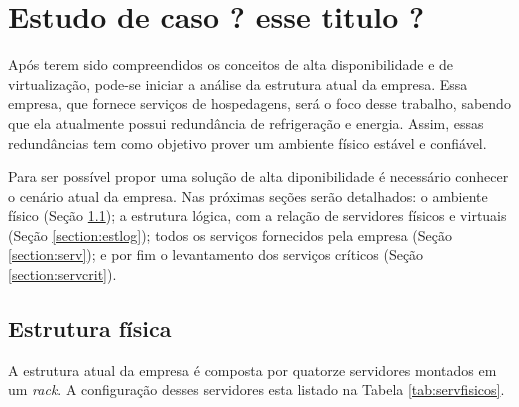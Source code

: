 \chapter{Estudo de caso ? esse titulo ?}
\label{cap:estudodecaso}

Após terem sido compreendidos os conceitos de alta disponibilidade e de virtualização, pode-se iniciar a análise da estrutura atual da empresa.
Essa empresa, que fornece serviços de hospedagens, será o foco desse trabalho, sabendo que ela atualmente possui redundância de refrigeração 
e energia. Assim, essas redundâncias tem como objetivo prover um ambiente físico estável e confiável.

Para ser possível propor uma solução de alta diponibilidade é necessário conhecer o cenário atual da empresa. 
Nas próximas seções serão detalhados: o ambiente físico (Seção \ref{section:estfis}); a estrutura lógica, com a relação de servidores físicos
e virtuais (Seção \ref{section:estlog}); todos os serviços fornecidos pela empresa (Seção \ref{section:serv}); e por fim o levantamento
dos serviços críticos (Seção \ref{section:servcrit}).

\section{Estrutura física}
\label{section:estfis}

A estrutura atual da empresa é composta por quatorze servidores montados em um \textit{rack}. A configuração desses servidores esta listado
na Tabela \ref{tab:servfisicos}.

